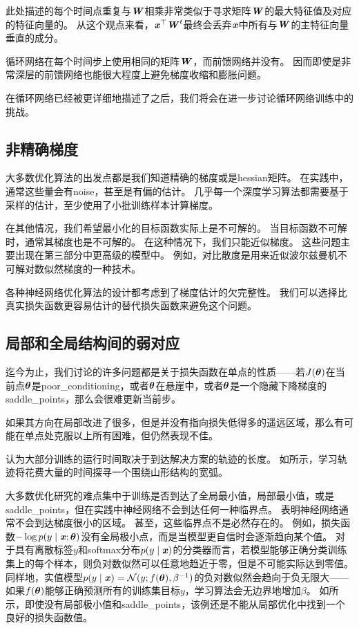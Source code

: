 此处描述的每个时间点重复与$\boldsymbol{\mathit{W}}$相乘非常类似于寻求矩阵$\boldsymbol{\mathit{W}}$的最大特征值及对应的特征向量的。
从这个观点来看，$\boldsymbol{\mathit{x}}^\top\boldsymbol{\mathit{W}}^t$最终会丢弃$\boldsymbol{\mathit{x}}$中所有与$\boldsymbol{\mathit{W}}$的主特征向量垂直的成分。

循环网络在每个时间步上使用相同的矩阵$\boldsymbol{\mathit{W}}$，而前馈网络并没有。
因而即使是非常深层的前馈网络也能很大程度上避免梯度收缩和膨胀问题\citep{Sussillo14}。

在循环网络已经被更详细地描述了之后，我们将会在进一步讨论循环网络训练中的挑战。

\subsection{非精确梯度}
\label{sec:inexact_gradients}
大多数优化算法的出发点都是我们知道精确的梯度或是\gls{hessian}矩阵。
在实践中，通常这些量会有\gls{noise}，甚至是有偏的估计。
几乎每一个深度学习算法都需要基于采样的估计，至少使用了小批训练样本计算梯度。


在其他情况，我们希望最小化的目标函数实际上是不可解的。
当目标函数不可解时，通常其梯度也是不可解的。
在这种情况下，我们只能近似梯度。
这些问题主要出现在第三部分中更高级的模型中。
例如，对比散度是用来近似波尔兹曼机不可解对数似然梯度的一种技术。

各种神经网络优化算法的设计都考虑到了梯度估计的欠完整性。
我们可以选择比真实损失函数更容易估计的替代损失函数来避免这个问题。

\subsection{局部和全局结构间的弱对应}
\label{sec:poor_correspondence_between_local_and_global_structure}
迄今为止，我们讨论的许多问题都是关于损失函数在单点的性质——若$J(\boldsymbol{\theta})$在当前点$\boldsymbol{\theta}$是\gls{poor_conditioning}，或者$\boldsymbol{\theta}$在悬崖中，或者$\boldsymbol{\theta}$是一个隐藏下降梯度的\gls{saddle_points}，那么会很难更新当前步。

如果其方向在局部改进了很多，但是并没有指向损失低得多的遥远区域，那么有可能在单点处克服以上所有困难，但仍然表现不佳。

\cite{GoodfellowOptimization15}认为大部分训练的运行时间取决于到达解决方案的轨迹的长度。 
如所示，学习轨迹将花费大量的时间探寻一个围绕山形结构的宽弧。

大多数优化研究的难点集中于训练是否到达了全局最小值，局部最小值，或是\gls{saddle_points}，但在实践中神经网络不会到达任何一种临界点。
表明神经网络通常不会到达梯度很小的区域。
甚至，这些临界点不是必然存在的。
例如，损失函数$-\log p(y\mid\boldsymbol{\mathit{x}};\boldsymbol{\theta})$没有全局极小点，而是当模型更自信时会逐渐趋向某个值。    
对于具有离散标签$y$和softmax分布$p(y\mid\boldsymbol{\mathit{x}})$的分类器而言，若模型能够正确分类训练集上的每个样本，则负对数似然可以任意地趋近于零，但是不可能实际达到零值。
同样地，实值模型$p(y\mid\boldsymbol{\mathit{x}}) = \mathcal{N}(y;f(\boldsymbol{\theta}),\beta^{-1})$的负对数似然会趋向于负无限大——如果$f(\boldsymbol{\theta})$能够正确预测所有的训练集目标$y$，学习算法会无边界地增加$\beta$。
如所示，即使没有局部极小值和\gls{saddle_points}，该例还是不能从局部优化中找到一个良好的损失函数值。

